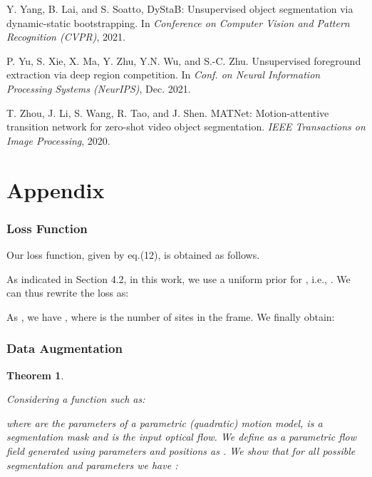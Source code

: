 \documentclass[10pt,twocolumn,letterpaper]{article}
\begin{document}
\begin{thebibliography}{28}
Y. Yang, B. Lai, and S. Soatto, 
\newblock DyStaB: Unsupervised object segmentation via dynamic-static bootstrapping.
\newblock In \emph{Conference on Computer Vision and Pattern Recognition (CVPR)}, 2021.

P. Yu, S. Xie, X. Ma, Y. Zhu, Y.N. Wu, and S.-C. Zhu.
\newblock Unsupervised foreground extraction via deep region competition.
\newblock In \emph{Conf. on Neural Information Processing Systems (NeurIPS)}, Dec. 2021.

T. Zhou, J. Li, S. Wang, R. Tao, and J. Shen.
\newblock MATNet: Motion-attentive transition network for zero-shot video object segmentation.
\newblock \emph{IEEE Transactions on Image Processing}, 2020.


\end{thebibliography}


\onecolumn

\part*{Appendix}
\setcounter{section}{0}

\section{Loss Function}
Our loss function, given by eq.(12), is obtained as follows.

As indicated in Section 4.2, in this work, we use a uniform prior for , i.e., . We can thus rewrite the loss  as:

As , we have , where  is the number of sites  in the frame. We finally obtain: 


\section{Data Augmentation}


\newtheorem{theorem}{Theorem}
\theoremstyle{remark}
\newtheorem*{remark}{Remark}

\begin{theorem}\label{th:daug-inv}

Considering a function  such as: 


where  are the parameters of a parametric (quadratic) motion model,  is a segmentation mask and  is the input optical flow. We define  as a parametric flow field generated using parameters  and positions  as . We show that for all possible segmentation  and parameters  we have : 



\end{theorem}
\end{document}
